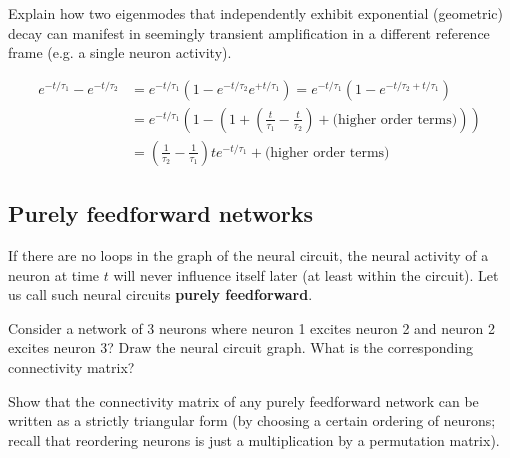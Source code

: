 \documentclass[a4paper,11pt]{exam}
\newcounter{ct}
\begin{document}
\begin{questions}
\question Explain how two eigenmodes that independently exhibit exponential (geometric) decay can manifest in seemingly transient amplification in a different reference frame (e.g. a single neuron activity).

\begin{tcolorbox}
    \begin{align}\label{eq:doe}
	e^{-t/\tau_1}
	-
	e^{-t/\tau_2}
	&=
	    e^{-t/\tau_1}
	    (
	    1
	    -
	    e^{-t/\tau_2}
	    e^{+t/\tau_1}
	    )
	=
	    e^{-t/\tau_1}
	    (
	    1
	    -
	    e^{-t/\tau_2+t/\tau_1}
	    )
	\\
	&=
	    e^{-t/\tau_1}
	    \left
	    (
	    1
	    -
	    \left(
	    1 + \left(\frac{t}{\tau_1}-\frac{t}{\tau_2}\right)
	    + \text{(higher order terms)}
	    \right)
	    \right)
	    \nonumber
	\\
	&=
	    \left(\frac{1}{\tau_2}-\frac{1}{\tau_1}\right)
	    t e^{-t/\tau_1}
	    + \text{(higher order terms)}
    \end{align}
\end{tcolorbox}

\subsection{Purely feedforward networks}
If there are no loops in the graph of the neural circuit, the neural activity of a neuron at time $t$ will never influence itself later (at least within the circuit).
Let us call such neural circuits \textbf{purely feedforward}.

\question Consider a network of 3 neurons where neuron 1 excites neuron 2 and neuron 2 excites neuron 3? Draw the neural circuit graph.
What is the corresponding connectivity matrix?

\question Show that the connectivity matrix of any purely feedforward network can be written as a strictly triangular form (by choosing a certain ordering of neurons; recall that reordering neurons is just a multiplication by a permutation matrix).



\end{questions}
\end{document}
